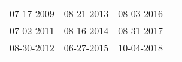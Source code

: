 \begin{supertabular}{llll}
 07-17-2009 &  08-21-2013 &  08-03-2016 \\
 07-02-2011 &  08-16-2014 &  08-31-2017 \\
 08-30-2012 &  06-27-2015 &  10-04-2018 \\
\end{supertabular}
